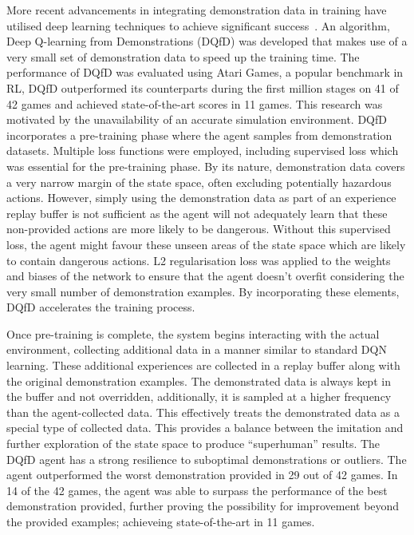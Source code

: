 More recent advancements in integrating demonstration data in training have utilised deep learning techniques to achieve significant success~\cite{deepQLearningFromDemo}.
An algorithm, Deep Q-learning from Demonstrations (DQfD) was developed that makes use of a very small set of demonstration data to speed up the training time.
The performance of DQfD was evaluated using Atari Games, a popular benchmark in RL, DQfD outperformed its counterparts during the first million stages on 41 of 42 games and achieved state-of-the-art scores in 11 games.
This research was motivated by the unavailability of an accurate simulation environment.
DQfD incorporates a pre-training phase where the agent samples from demonstration datasets.
Multiple loss functions were employed, including supervised loss which was essential for the pre-training phase.
By its nature, demonstration data covers a very narrow margin of the state space, often excluding potentially hazardous actions.
However, simply using the demonstration data as part of an experience replay buffer is not sufficient as the agent will not adequately learn that these non-provided actions are more likely to be dangerous.
Without this supervised loss, the agent might favour these unseen areas of the state space which are likely to contain dangerous actions.
L2 regularisation loss was applied to the weights and biases of the network to ensure that the agent doesn't overfit considering the very small number of demonstration examples.
By incorporating these elements, DQfD accelerates the training process.

Once pre-training is complete, the system begins interacting with the actual environment, collecting additional data in a manner similar to standard DQN learning.
These additional experiences are collected in a replay buffer along with the original demonstration examples.
The demonstrated data is always kept in the buffer and not overridden, additionally, it is sampled at a higher frequency than the agent-collected data.
This effectively treats the demonstrated data as a special type of collected data.
This provides a balance between the imitation and further exploration of the state space to produce ``superhuman'' results.
The DQfD agent has a strong resilience to suboptimal demonstrations or outliers.
The agent outperformed the worst demonstration provided in 29 out of 42 games.
In 14 of the 42 games, the agent was able to surpass the performance of the best demonstration provided, further proving the possibility for improvement beyond the provided examples; achieveing state-of-the-art in 11 games.

